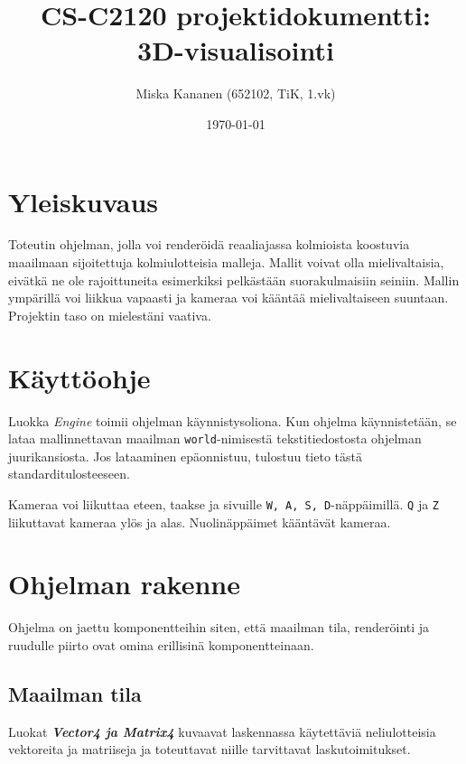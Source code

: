 \documentclass[12pt] {article}
\begin{document}
\title {CS-C2120 projektidokumentti: \\ 3D-visualisointi}
\author {Miska Kananen (652102, TiK, 1.vk)}
\date {\today}
\maketitle

\tableofcontents

\section {Yleiskuvaus}

Toteutin ohjelman, jolla voi renderöidä reaaliajassa kolmioista koostuvia maailmaan sijoitettuja kolmiulotteisia malleja. Mallit voivat olla mielivaltaisia, eivätkä ne ole rajoittuneita esimerkiksi pelkästään suorakulmaisiin seiniin. Mallin ympärillä voi liikkua vapaasti ja kameraa voi kääntää mielivaltaiseen suuntaan. Projektin taso on mielestäni vaativa.

\section {Käyttöohje}

Luokka \textit{Engine} toimii ohjelman käynnistysoliona. Kun ohjelma käynnistetään, se lataa mallinnettavan maailman \texttt{world}-nimisestä tekstitiedostosta ohjelman juurikansiosta. Jos lataaminen epäonnistuu, tulostuu tieto tästä standarditulosteeseen.

Kameraa voi liikuttaa eteen, taakse ja sivuille \texttt{W, A, S, D}-näppäimillä. \texttt{Q} ja \texttt{Z} liikuttavat kameraa ylös ja alas. Nuolinäppäimet kääntävät kameraa.

\section {Ohjelman rakenne}

Ohjelma on jaettu komponentteihin siten, että maailman tila, renderöinti ja ruudulle piirto ovat omina erillisinä komponentteinaan.

\subsection {Maailman tila}

Luokat \textit{\textbf{Vector4 ja Matrix4}} kuvaavat laskennassa käytettäviä neliulotteisia vektoreita ja matriiseja ja toteuttavat niille tarvittavat laskutoimitukset.
\end{document}
